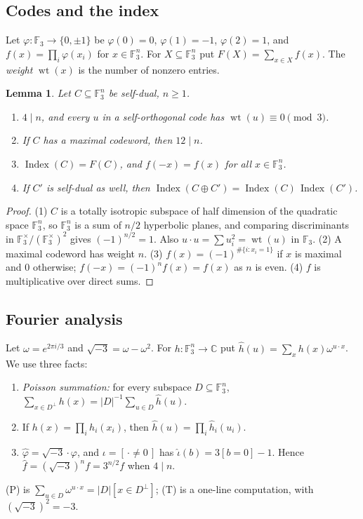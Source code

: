 \documentclass[11pt]{amsart}
\newtheorem{lemma}[theorem]{Lemma}
\theoremstyle{definition}
\newcommand{\F}{\mathbb{F}_3}
\newcommand{\wt}{\operatorname{wt}}
\newcommand{\Index}{\operatorname{Index}}
\newcommand{\isq}{\sqrt{-3}}
\begin{document}
\subsection{Codes and the index}
Let $\varphi\colon\F\to\{0,\pm1\}$ be $\varphi(0)=0$, $\varphi(1)=-1$, $\varphi(2)=1$, and
$f(x)=\prod_i\varphi(x_i)$ for $x\in\F^n$. For $X\subseteq\F^n$ put $F(X)=\sum_{x\in X}f(x)$. The
\emph{weight} $\wt(x)$ is the number of nonzero entries.

\begin{lemma}\label{lem:basic}
Let $C\subseteq\F^n$ be self-dual, $n\ge1$.
\begin{enumerate}
\item $4\mid n$, and every $u$ in a self-orthogonal code has $\wt(u)\equiv0\pmod3$.
\item If $C$ has a maximal codeword, then $12\mid n$.
\item $\Index(C)=F(C)$, and $f(-x)=f(x)$ for all $x\in\F^n$.
\item If $C'$ is self-dual as well, then $\Index(C\oplus C')=\Index(C)\,\Index(C')$.
\end{enumerate}
\end{lemma}

\begin{proof}
(1) $C$ is a totally isotropic subspace of half dimension of the quadratic space $\F^n$, so $\F^n$
is a sum of $n/2$ hyperbolic planes, and comparing discriminants in $\F^\times/(\F^\times)^2$ gives
$(-1)^{n/2}=1$. Also $u\cdot u=\sum u_i^2=\wt(u)$ in $\F$. (2) A maximal codeword has weight $n$.
(3) $f(x)=(-1)^{\#\{i:x_i=1\}}$ if $x$ is maximal and $0$ otherwise; $f(-x)=(-1)^nf(x)=f(x)$ as $n$ is
even. (4) $f$ is multiplicative over direct sums.
\end{proof}

\subsection{Fourier analysis}
Let $\omega=e^{2\pi i/3}$ and $\isq=\omega-\omega^2$. For $h\colon\F^n\to\mathbb C$ put
$\hat h(u)=\sum_xh(x)\omega^{u\cdot x}$. We use three facts:
\begin{enumerate}
\item[(P)] \emph{Poisson summation:} for every subspace $D\subseteq\F^n$,
  $\sum_{x\in D^\perp}h(x)=|D|^{-1}\sum_{u\in D}\hat h(u)$.
\item[(M)] If $h(x)=\prod_ih_i(x_i)$, then $\hat h(u)=\prod_i\hat h_i(u_i)$.
\item[(T)] $\hat\varphi=\isq\cdot\varphi$, and $\iota=[\,\cdot\neq0\,]$ has
  $\hat\iota(b)=3[b=0]-1$. Hence $\hat f=(\isq)^nf=3^{n/2}f$ when $4\mid n$.
\end{enumerate}
(P) is $\sum_{u\in D}\omega^{u\cdot x}=|D|[x\in D^\perp]$; (T) is a one-line computation, with
$(\isq)^2=-3$.
\end{document}
